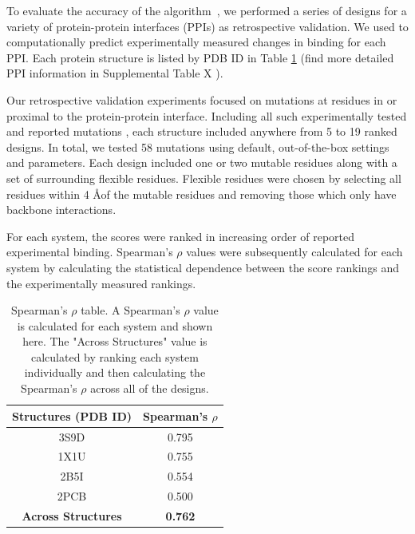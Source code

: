 To evaluate the accuracy of the \osprey \ks algorithm~\cite{K*}, we performed a series of designs for a variety of protein-protein interfaces (PPIs) as retrospective validation. We used \ks to computationally predict experimentally measured changes in binding for each PPI. Each protein structure is listed by PDB ID in Table \ref{table:spearman} \cite{pdb1x1u,pdb2pcb,pdb3s9d,pdb2b5i}(find more detailed PPI information in Supplemental Table X ).


Our retrospective validation experiments focused on mutations at residues in or proximal to the protein-protein interface. Including all such experimentally tested and reported mutations \cite{binding2barnase,bindingbarnase,bindingcytc,bindingifna2,bindingil2}, each structure included anywhere from 5 to 19 ranked designs. In total, we tested 58 mutations using default, out-of-the-box \osprey settings and parameters. Each design included one or two mutable residues along with a set of surrounding flexible residues. Flexible residues were chosen by selecting all residues within 4 \AA of the mutable residues and removing those which only have backbone interactions. 

For each system, the \ks scores were ranked in increasing order of reported experimental binding. Spearman's $\rho$ values were subsequently calculated for each system by calculating the statistical dependence between the \ks score rankings and the experimentally measured rankings. 

\begin{table}[h!]\label{table:spearman}
\centering
\begin{tabular}{ |c||c|  }
 \hline
 \textbf{Structures (PDB ID)}& \textbf{Spearman's $\rho$} \\
 \hline 
 3S9D   & 0.795 \\
 \hline
 1X1U   & 0.755 \\
 \hline
 2B5I   & 0.554 \\
 \hline
 2PCB   & 0.500 \\
 \hline
 \textbf{Across Structures} &   \textbf{0.762}  \\
 \hline
\end{tabular}
\caption{Spearman's $\rho$ table. A Spearman's $\rho$ value is calculated for each system and shown here. The "Across Structures" value is calculated by ranking each system individually and then calculating the Spearman's $\rho$ across all of the designs.}
\end{table}

